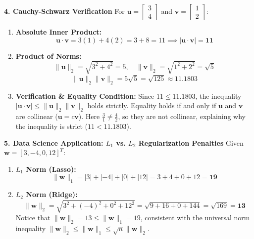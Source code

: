 \textbf{4. Cauchy-Schwarz Verification}
For $\mathbf{u} = \begin{bmatrix} 3 \\ 4 \end{bmatrix}$ and $\mathbf{v} = \begin{bmatrix} 1 \\ 2 \end{bmatrix}$:
\begin{enumerate}
    \item \textbf{Absolute Inner Product:}
    \begin{equation*}
    \mathbf{u} \cdot \mathbf{v} = 3(1) + 4(2) = 3 + 8 = 11 \implies |\mathbf{u} \cdot \mathbf{v}| = \mathbf{11}
    \end{equation*}
    \item \textbf{Product of Norms:}
    \begin{equation*}
    \|\mathbf{u}\|_2 = \sqrt{3^2 + 4^2} = 5, \quad \|\mathbf{v}\|_2 = \sqrt{1^2 + 2^2} = \sqrt{5}
    \end{equation*}
    \begin{equation*}
    \|\mathbf{u}\|_2 \|\mathbf{v}\|_2 = 5\sqrt{5} = \sqrt{125} \approx \mathbf{11.1803}
    \end{equation*}
    \item \textbf{Verification \& Equality Condition:}
    Since $11 \le 11.1803$, the inequality $|\mathbf{u} \cdot \mathbf{v}| \le \|\mathbf{u}\|_2 \|\mathbf{v}\|_2$ holds strictly.
    Equality holds if and only if $\mathbf{u}$ and $\mathbf{v}$ are collinear ($\mathbf{u} = c\mathbf{v}$). Here $\frac{3}{1} \neq \frac{4}{2}$, so they are not collinear, explaining why the inequality is strict ($11 < 11.1803$).
\end{enumerate}

\textbf{5. Data Science Application: $L_1$ vs. $L_2$ Regularization Penalties}
Given $\mathbf{w} = [3, -4, 0, 12]^T$:
\begin{enumerate}
    \item \textbf{$L_1$ Norm (Lasso):}
    \begin{equation*}
    \|\mathbf{w}\|_1 = |3| + |-4| + |0| + |12| = 3 + 4 + 0 + 12 = \mathbf{19}
    \end{equation*}
    \item \textbf{$L_2$ Norm (Ridge):}
    \begin{equation*}
    \|\mathbf{w}\|_2 = \sqrt{3^2 + (-4)^2 + 0^2 + 12^2} = \sqrt{9 + 16 + 0 + 144} = \sqrt{169} = \mathbf{13}
    \end{equation*}
    Notice that $\|\mathbf{w}\|_2 = 13 \le \|\mathbf{w}\|_1 = 19$, consistent with the universal norm inequality $\|\mathbf{w}\|_2 \le \|\mathbf{w}\|_1 \le \sqrt{n}\|\mathbf{w}\|_2$.
\end{enumerate}


